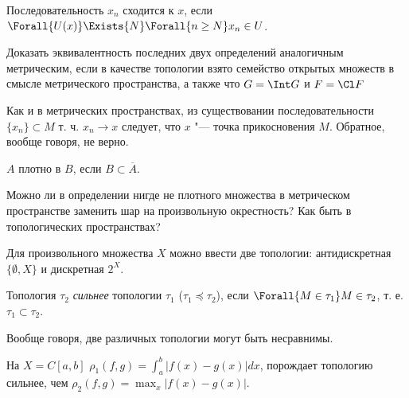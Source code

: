 \documentclass[main]{subfiles}
\begin{document}
\begin{definition}
  Последовательность \( x_n \) сходится к \( x \), если
  \( \Forall{U(x)} \Exists{N} \Forall{n \ge N} x_n \in U \).
\end{definition}

\begin{exercise}
  Доказать эквивалентность последних двух определений аналогичным
  метрическим, если в качестве топологии взято семейство
  открытых множеств в смысле метрического пространства,
  а также что \( G = \Int G \) и \( F = \Cl F  \)
\end{exercise}

\begin{remark}
  Как и в метрических пространствах,
  из существовании последовательности
  \( \{ x_n \} \subset M \) т. ч. \( x_n \to x \)
  следует, что \( x \) "--- точка прикосновения \( M \).
  Обратное, вообще говоря, не верно.
\end{remark}

\begin{definition}
  \( A \) плотно в \( B \), если \( B \subset \overline{A} \).
\end{definition}

\begin{exercise}
  Можно ли в определении
  нигде не плотного множества в
  метрическом пространстве
  заменить шар на произвольную окрестность?
  Как быть в топологических пространствах?
\end{exercise}

\begin{example}
  Для произвольного множества \( X \) можно ввести две
  топологии: антидискретная \( \{ \emptyset, X \} \)
  и дискретная \( 2^X \).
\end{example}

\begin{definition}
  Топология \( \tau_2 \) \emph{сильнее} топологии \( \tau_1 \)
  (\( \tau_1 \preceq \tau_2 \)),
  если \( \Forall{M \in \tau_1} M \in \tau_2 \),
  т. е. \( \tau_1 \subset \tau_2 \).
\end{definition}

\begin{remark}
  Вообще говоря, две различных топологии могут быть несравнимы.
\end{remark}

\begin{example}
  На \( X = C[a, b] \) \( \rho_1(f, g) = \int_a^b |f(x) - g(x)| dx \),
  порождает топологию сильнее, чем
  \( \rho_2(f, g) = \max_x |f(x) - g(x)| \).
\end{example}
\end{document}
